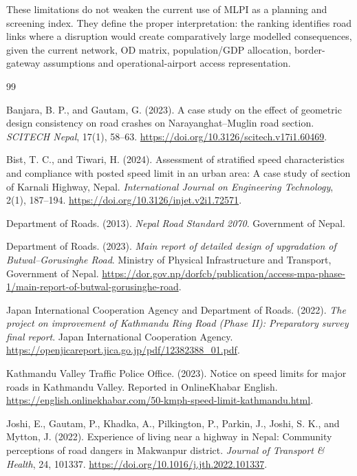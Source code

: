 \documentclass[11pt,a4paper]{article}
\begin{document}
These limitations do not weaken the current use of MLPI as a planning and
screening index. They define the proper interpretation: the ranking identifies
road links where a disruption would create comparatively large modelled
consequences, given the current network, OD matrix, population/GDP allocation,
border-gateway assumptions and operational-airport access representation.

\begin{thebibliography}{99}

Banjara, B. P., and Gautam, G. (2023).
\newblock A case study on the effect of geometric design consistency on road
crashes on Narayanghat--Muglin road section.
\newblock \emph{SCITECH Nepal}, 17(1), 58--63.
\newblock \url{https://doi.org/10.3126/scitech.v17i1.60469}.

Bist, T. C., and Tiwari, H. (2024).
\newblock Assessment of stratified speed characteristics and compliance with
posted speed limit in an urban area: A case study of section of Karnali
Highway, Nepal.
\newblock \emph{International Journal on Engineering Technology}, 2(1),
187--194.
\newblock \url{https://doi.org/10.3126/injet.v2i1.72571}.

Department of Roads. (2013).
\newblock \emph{Nepal Road Standard 2070}.
\newblock Government of Nepal.

Department of Roads. (2023).
\newblock \emph{Main report of detailed design of upgradation of
Butwal--Gorusinghe Road}.
\newblock Ministry of Physical Infrastructure and Transport, Government of
Nepal.
\newblock \url{https://dor.gov.np/dorfcb/publication/access-mpa-phase-1/main-report-of-butwal-gorusinghe-road}.

Japan International Cooperation Agency and Department of Roads. (2022).
\newblock \emph{The project on improvement of Kathmandu Ring Road (Phase II):
Preparatory survey final report}.
\newblock Japan International Cooperation Agency.
\newblock \url{https://openjicareport.jica.go.jp/pdf/12382388_01.pdf}.

Kathmandu Valley Traffic Police Office. (2023).
\newblock Notice on speed limits for major roads in Kathmandu Valley.
\newblock Reported in OnlineKhabar English.
\newblock \url{https://english.onlinekhabar.com/50-kmph-speed-limit-kathmandu.html}.

Joshi, E., Gautam, P., Khadka, A., Pilkington, P., Parkin, J., Joshi, S. K.,
and Mytton, J. (2022).
\newblock Experience of living near a highway in Nepal: Community perceptions
of road dangers in Makwanpur district.
\newblock \emph{Journal of Transport \& Health}, 24, 101337.
\newblock \url{https://doi.org/10.1016/j.jth.2022.101337}.


\end{thebibliography}
\end{document}
